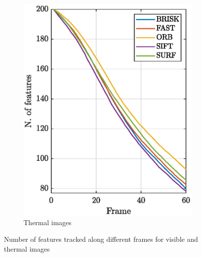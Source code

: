 \begin{figure}[!h]
\begin{subfigure}[b]{0.46\textwidth}
         \includegraphics[width=\textwidth]{Images/TIRTracking.eps}
         \caption{Thermal images}
         \label{fig:trackingtir}
     \end{subfigure}
        \caption{Number of features tracked along different frames for visible and thermal images}
        \label{fig:ntracking}
\end{figure}


